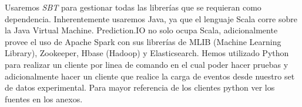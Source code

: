 Usaremos \emph{SBT} para gestionar todas las librerías que se requieran como dependencia. Inherentemente usaremos Java, ya que el lenguaje Scala corre sobre la Java Virtual Machine. Prediction.IO no solo ocupa Scala, adicionalmente provee el uso de Apache Spark con sus librerías de MLIB (Machine Learning Library), Zookeeper, Hbase (Hadoop) y Elasticsearch. Hemos utilizado Python para realizar un cliente por linea de comando en el cual poder hacer pruebas y adicionalmente hacer un cliente que realice la carga de eventos desde nuestro set de datos experimental. Para mayor referencia de los clientes python ver los fuentes en los anexos.












